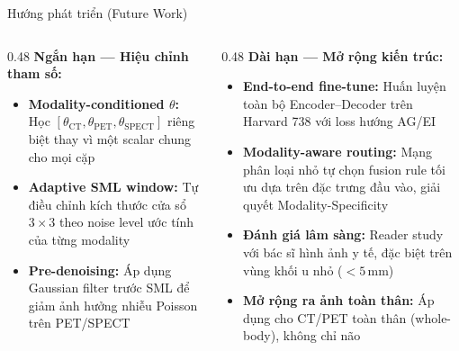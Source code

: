 \documentclass[t, aspectratio=169]{beamer}
\begin{document}
\begin{frame}{Hướng phát triển (Future Work)}
    \begin{columns}[T]
        \begin{column}{0.48\textwidth}
            \textbf{Ngắn hạn --- Hiệu chỉnh tham số:}
            \begin{itemize}\itemsep3pt\small
                \item \textbf{Modality-conditioned $\theta$:} Học $[\theta_\text{CT}, \theta_\text{PET}, \theta_\text{SPECT}]$ riêng biệt thay vì một scalar chung cho mọi cặp
                \item \textbf{Adaptive SML window:} Tự điều chỉnh kích thước cửa sổ $3\times3$ theo noise level ước tính của từng modality
                \item \textbf{Pre-denoising:} Áp dụng Gaussian filter trước SML để giảm ảnh hưởng nhiễu Poisson trên PET/SPECT
            \end{itemize}
        \end{column}
        \begin{column}{0.48\textwidth}
            \textbf{Dài hạn --- Mở rộng kiến trúc:}
            \begin{itemize}\itemsep3pt\small
                \item \textbf{End-to-end fine-tune:} Huấn luyện toàn bộ Encoder--Decoder trên Harvard 738 với loss hướng AG/EI
                \item \textbf{Modality-aware routing:} Mạng phân loại nhỏ tự chọn fusion rule tối ưu dựa trên đặc trưng đầu vào, giải quyết Modality-Specificity
                \item \textbf{Đánh giá lâm sàng:} Reader study với bác sĩ hình ảnh y tế, đặc biệt trên vùng khối u nhỏ ($<5$\,mm)
                \item \textbf{Mở rộng ra ảnh toàn thân:} Áp dụng cho CT/PET toàn thân (whole-body), không chỉ não
            \end{itemize}
        \end{column}
    \end{columns}
\end{frame}
\end{document}
